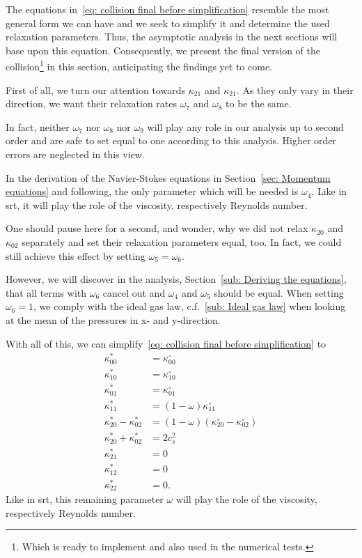 The equations in~\eqref{eq: collision final before simplification} resemble the most general form we can have and we seek to simplify it and determine the used relaxation parameters.
Thus, the asymptotic analysis in the next sections will base upon this equation.
Consequently, we present the final version of the collision\footnote{Which is ready to implement and also used in the numerical tests.} in this section, anticipating the findings yet to come.

First of all, we turn our attention towards $\kappa_{21}$ and $\kappa_{21}$.
As they only vary in their direction, we want their relaxation rates $\omega_7$ and $\omega_8$ to be the same.

In fact, neither $\omega_7$ nor $\omega_8$ nor $\omega_9$ will play any role in our analysis up to second order and are safe to set equal to one according to this analysis.
Higher order errors are neglected in this view.

In the derivation of the Navier-Stokes equations in Section~\ref{sec: Momentum equations} and following, the only parameter which will be needed is $\omega_4$.
Like in \gls{srt}, it will play the role of the viscosity, respectively Reynolds number.

One should pause here for a second, and wonder, why we did not relax $\kappa_{20}$ and $\kappa_{02}$ separately and set their relaxation parameters equal, too.
In fact, we could still achieve this effect by setting $\omega_5=\omega_6$.

However, we will discover in the analysis, Section~\ref{sub: Deriving the equations}, that all terms with $\omega_6$ cancel out and $\omega_4$ and $\omega_5$ should be equal.
When setting $\omega_6=1$, we comply with the ideal gas law, c.f.~\ref{sub: Ideal gas law} when looking at the mean of the pressures in x- and y-direction.

With all of this, we can simplify~\eqref{eq: collision final before simplification} to
\begin{equation}
  \label{eq: collision equation system full}
  \begin{aligned}
    \kappa_{00}^{*} & = \kappa_{00}^{\circ}\\
    \kappa_{10}^{*} & = \kappa_{10}^{\circ}\\
    \kappa_{01}^{*} & = \kappa_{01}^{\circ}\\
    \kappa_{11}^{*} & = (1-\omega)\kappa_{11}^{\circ}\\
    \kappa_{20}^{*} - \kappa_{02}^{*}
      & = (1-\omega) (\kappa_{20}^{\circ}- \kappa_{02}^{\circ}) \\
    \kappa_{20}^{*} + \kappa_{02}^{*}
      & = 2 c_s^2 \\
    \kappa_{21}^{*} & = 0 \\
    \kappa_{12}^{*} & = 0 \\
    \kappa_{22}^{*} & = 0.
  \end{aligned}
\end{equation}
Like in \gls{srt}, this remaining parameter $\omega$ will play the role of the viscosity, respectively Reynolds number.

